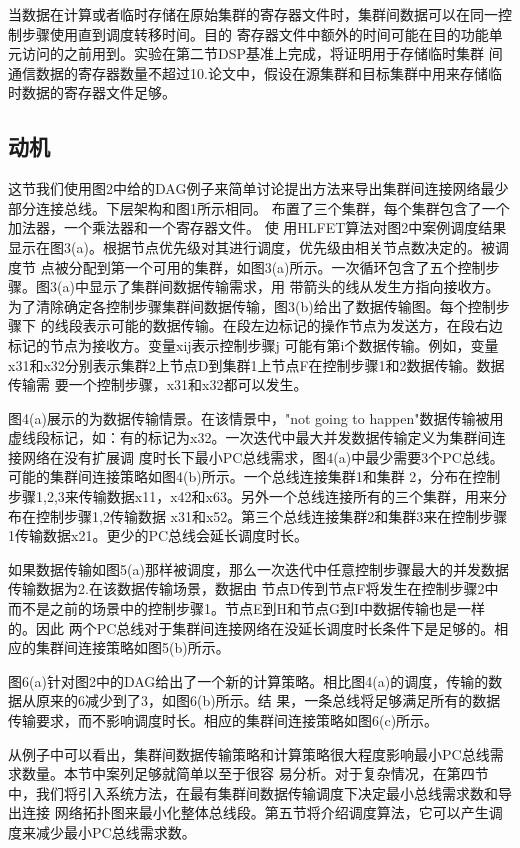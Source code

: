 当数据在计算或者临时存储在原始集群的寄存器文件时，集群间数据可以在同一控制步骤使用直到调度转移时间。目的
寄存器文件中额外的时间可能在目的功能单元访问的之前用到。实验在第二节DSP基准上完成，将证明用于存储临时集群
间通信数据的寄存器数量不超过10.论文中，假设在源集群和目标集群中用来存储临时数据的寄存器文件足够。
\subsection{动机}
这节我们使用图2中给的DAG例子来简单讨论提出方法来导出集群间连接网络最少部分连接总线。下层架构和图1所示相同。
布置了三个集群，每个集群包含了一个加法器，一个乘法器和一个寄存器文件。
使
用HLFET算法对图2中案例调度结果显示在图3(a)。根据节点优先级对其进行调度，优先级由相关节点数决定的。被调度节
点被分配到第一个可用的集群，如图3(a)所示。一次循环包含了五个控制步骤。图3(a)中显示了集群间数据传输需求，用
带箭头的线从发生方指向接收方。为了清除确定各控制步骤集群间数据传输，图3(b)给出了数据传输图。每个控制步骤下
的线段表示可能的数据传输。在段左边标记的操作节点为发送方，在段右边标记的节点为接收方。变量xij表示控制步骤j
可能有第i个数据传输。例如，变量x31和x32分别表示集群2上节点D到集群1上节点F在控制步骤1和2数据传输。数据传输需
要一个控制步骤，x31和x32都可以发生。

图4(a)展示的为数据传输情景。在该情景中，"not going to happen"数据传输被用虚线段标记，如：有的标记为x32。一次迭代中最大并发数据传输定义为集群间连接网络在没有扩展调
度时长下最小PC总线需求，图4(a)中最少需要3个PC总线。可能的集群间连接策略如图4(b)所示。一个总线连接集群1和集群
2，分布在控制步骤1,2,3来传输数据x11，x42和x63。另外一个总线连接所有的三个集群，用来分布在控制步骤1,2传输数据
x31和x52。第三个总线连接集群2和集群3来在控制步骤1传输数据x21。更少的PC总线会延长调度时长。

如果数据传输如图5(a)那样被调度，那么一次迭代中任意控制步骤最大的并发数据传输数据为2.在该数据传输场景，数据由
节点D传到节点F将发生在控制步骤2中而不是之前的场景中的控制步骤1。节点E到H和节点G到I中数据传输也是一样的。因此
两个PC总线对于集群间连接网络在没延长调度时长条件下是足够的。相应的集群间连接策略如图5(b)所示。

图6(a)针对图2中的DAG给出了一个新的计算策略。相比图4(a)的调度，传输的数据从原来的6减少到了3，如图6(b)所示。结
果，一条总线将足够满足所有的数据传输要求，而不影响调度时长。相应的集群间连接策略如图6(c)所示。

从例子中可以看出，集群间数据传输策略和计算策略很大程度影响最小PC总线需求数量。本节中案列足够就简单以至于很容
易分析。对于复杂情况，在第四节中，我们将引入系统方法，在最有集群间数据传输调度下决定最小总线需求数和导出连接
网络拓扑图来最小化整体总线段。第五节将介绍调度算法，它可以产生调度来减少最小PC总线需求数。
